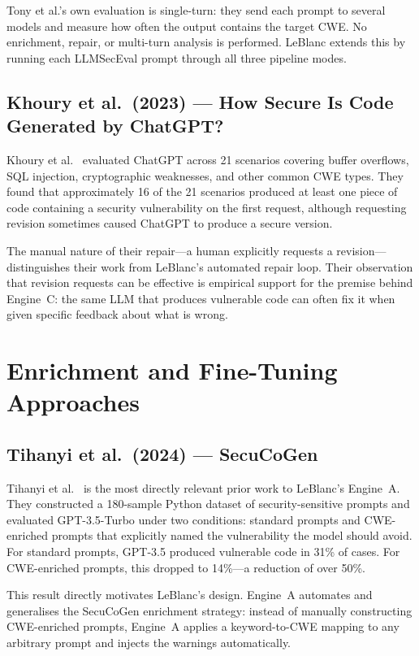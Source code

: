 \documentclass[12pt,a4paper]{report}
\begin{document}
Tony et al.'s own evaluation is single-turn: they send each prompt to several
models and measure how often the output contains the target CWE. No enrichment,
repair, or multi-turn analysis is performed. LeBlanc extends this by running each
LLMSecEval prompt through all three pipeline modes.

\subsection{Khoury et al.\ (2023) --- How Secure Is Code Generated by ChatGPT?}
\label{ssec:khoury}

Khoury et al.~\cite{khoury2023secure} evaluated ChatGPT across 21 scenarios
covering buffer overflows, SQL injection, cryptographic weaknesses, and other
common CWE types. They found that approximately 16 of the 21 scenarios produced
at least one piece of code containing a security vulnerability on the first
request, although requesting revision sometimes caused ChatGPT to produce a
secure version.

The manual nature of their repair---a human explicitly requests a
revision---distinguishes their work from LeBlanc's automated repair loop.
Their observation that revision requests can be effective is empirical support
for the premise behind Engine~C: the same LLM that produces vulnerable code can
often fix it when given specific feedback about what is wrong.

\section{Enrichment and Fine-Tuning Approaches}
\label{sec:litenrich}

\subsection{Tihanyi et al.\ (2024) --- SecuCoGen}
\label{ssec:secucogen}

Tihanyi et al.~\cite{tihanyi2023secucogenicse} is the most directly relevant
prior work to LeBlanc's Engine~A. They constructed a 180-sample Python dataset
of security-sensitive prompts and evaluated GPT-3.5-Turbo under two conditions:
standard prompts and CWE-enriched prompts that explicitly named the vulnerability
the model should avoid. For standard prompts, GPT-3.5 produced vulnerable code
in 31\% of cases. For CWE-enriched prompts, this dropped to 14\%---a reduction
of over 50\%.

This result directly motivates LeBlanc's design. Engine~A automates and
generalises the SecuCoGen enrichment strategy: instead of manually constructing
CWE-enriched prompts, Engine~A applies a keyword-to-CWE mapping to any
arbitrary prompt and injects the warnings automatically.
\end{document}
